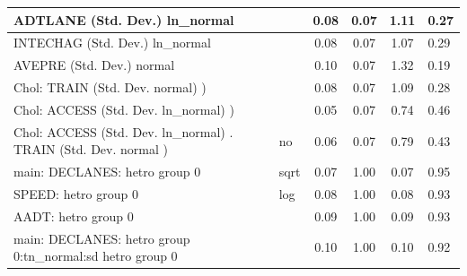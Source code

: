 \begin{table}
\begin{center}
\begin{tabular}{|l|l|c|c|c|l|}
			\hline
			ADTLANE (Std. Dev.) ln_normal &  & 0.08 & 0.07 & 1.11 & 0.27 \\
			\hline
			INTECHAG (Std. Dev.) ln_normal &  & 0.08 & 0.07 & 1.07 & 0.29 \\
			\hline
			AVEPRE (Std. Dev.) normal &  & 0.10 & 0.07 & 1.32 & 0.19 \\
			\hline
			 Chol: TRAIN (Std. Dev. normal) ) &  & 0.08 & 0.07 & 1.09 & 0.28 \\
			\hline
			 Chol: ACCESS (Std. Dev. ln_normal) ) &  & 0.05 & 0.07 & 0.74 & 0.46 \\
			\hline
			 Chol: ACCESS (Std. Dev. ln_normal) . TRAIN (Std. Dev.   normal ) & no & 0.06 & 0.07 & 0.79 & 0.43 \\
			\hline
			main: DECLANES: hetro group 0 & sqrt & 0.07 & 1.00 & 0.07 & 0.95 \\
			\hline
			SPEED: hetro group 0 & log & 0.08 & 1.00 & 0.08 & 0.93 \\
			\hline
			AADT: hetro group 0 &  & 0.09 & 1.00 & 0.09 & 0.93 \\
			\hline
			main: DECLANES: hetro group 0:tn_normal:sd  hetro group 0 &  & 0.10 & 1.00 & 0.10 & 0.92 \\
			\hline
		\end{tabular}
	\end{center}
\end{table}